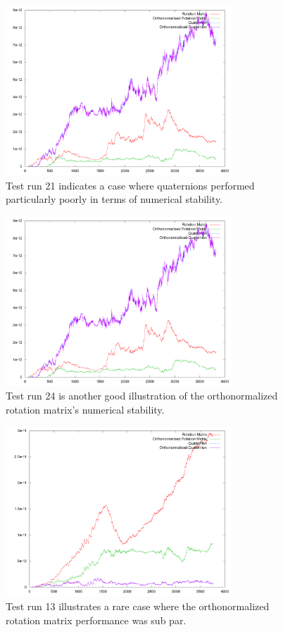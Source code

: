 \documentclass{acm_proc_article-sp}
\begin{document}
\begin{figure}
\includegraphics[width=8.5cm]{plots/stability_plot_21.png}
\caption{Test run 21 indicates a case where quaternions performed particularly poorly in terms of numerical stability.}
\end{figure}
\begin{figure}
\includegraphics[width=8.5cm]{plots/stability_plot_21.png}
\caption{Test run 24 is another good illustration of the orthonormalized rotation matrix's numerical stability.}
\end{figure}
\begin{figure}
\includegraphics[width=8.5cm]{plots/stability_plot_13.png}
\caption{Test run 13 illustrates a rare case where the orthonormalized rotation matrix performance was sub par.}
\end{figure}
\end{document}
